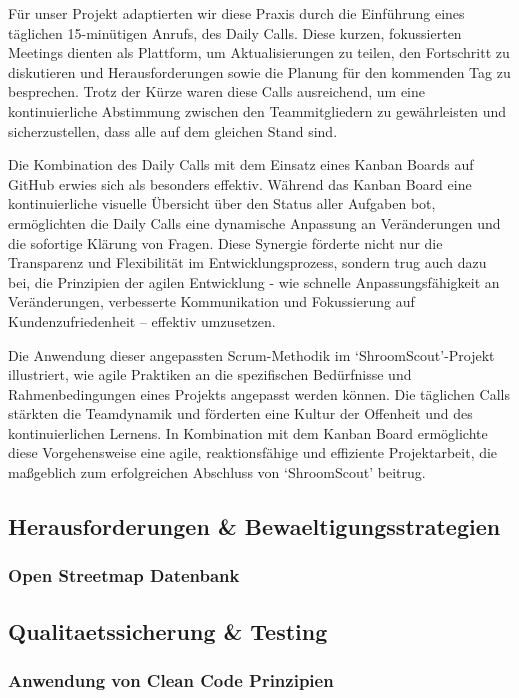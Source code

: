 \documentclass[../main.tex]{subfiles} %
\begin{document}
Für unser Projekt adaptierten wir diese Praxis durch die Einführung eines täglichen 15-minütigen Anrufs, des Daily Calls. Diese kurzen, fokussierten Meetings
dienten als Plattform, um Aktualisierungen zu teilen, den Fortschritt zu diskutieren und Herausforderungen sowie die Planung für den kommenden Tag zu besprechen.
Trotz der Kürze waren diese Calls ausreichend, um eine kontinuierliche Abstimmung zwischen den Teammitgliedern zu gewährleisten und sicherzustellen, dass alle
auf dem gleichen Stand sind.

Die Kombination des Daily Calls mit dem Einsatz eines Kanban Boards auf GitHub erwies sich als besonders effektiv. Während das Kanban Board eine kontinuierliche
visuelle Übersicht über den Status aller Aufgaben bot, ermöglichten die Daily Calls eine dynamische Anpassung an Veränderungen und die sofortige Klärung von
Fragen. Diese Synergie förderte nicht nur die Transparenz und Flexibilität im Entwicklungsprozess, sondern trug auch dazu bei, die Prinzipien der agilen Entwicklung
- wie schnelle Anpassungsfähigkeit an Veränderungen, verbesserte Kommunikation und Fokussierung auf Kundenzufriedenheit – effektiv umzusetzen.

Die Anwendung dieser angepassten Scrum-Methodik im `ShroomScout'-Projekt illustriert, wie agile Praktiken an die spezifischen Bedürfnisse und Rahmenbedingungen
eines Projekts angepasst werden können. Die täglichen Calls stärkten die Teamdynamik und förderten eine Kultur der Offenheit und des kontinuierlichen Lernens.
In Kombination mit dem Kanban Board ermöglichte diese Vorgehensweise eine agile, reaktionsfähige und effiziente Projektarbeit, die maßgeblich zum erfolgreichen
Abschluss von `ShroomScout' beitrug.

\subsection{Herausforderungen \& Bewaeltigungsstrategien} %

\subsubsection{Open Streetmap Datenbank}

\subsection{Qualitaetssicherung \& Testing} %

\subsubsection{Anwendung von Clean Code Prinzipien}
\end{document}
